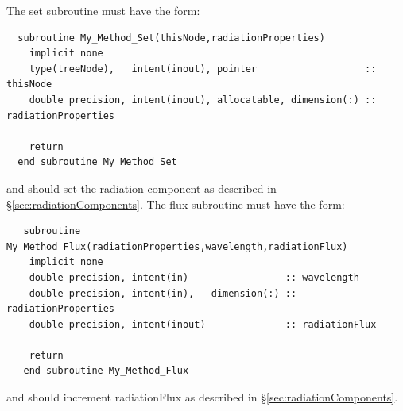 The set subroutine must have the form:
\begin{verbatim}
  subroutine My_Method_Set(thisNode,radiationProperties)
    implicit none
    type(treeNode),   intent(inout), pointer                   :: thisNode
    double precision, intent(inout), allocatable, dimension(:) :: radiationProperties

    return
  end subroutine My_Method_Set
\end{verbatim}
and should set the radiation component as described in \S\ref{sec:radiationComponents}. The flux subroutine must have the form:
\begin{verbatim}
   subroutine My_Method_Flux(radiationProperties,wavelength,radiationFlux)
    implicit none
    double precision, intent(in)                 :: wavelength
    double precision, intent(in),   dimension(:) :: radiationProperties
    double precision, intent(inout)              :: radiationFlux

    return
   end subroutine My_Method_Flux
\end{verbatim}
and should increment {\normalfont \ttfamily radiationFlux} as described in \S\ref{sec:radiationComponents}.

